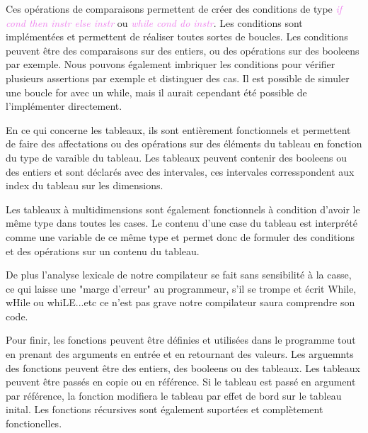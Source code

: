 \documentclass[a4paper]{article}
\let\oldtextit\textit
\renewcommand{\textit}[1]{\textcolor{violet}{\oldtextit{#1}}}
\begin{document}
Ces opérations de comparaisons permettent de créer des conditions de type \textit{if cond then instr else instr } ou \textit{while cond do instr}. Les conditions sont implémentées et permettent de réaliser toutes sortes de boucles. Les conditions peuvent être des comparaisons sur des entiers, ou des opérations sur des booleens par exemple.
Nous pouvons également imbriquer les conditions pour vérifier plusieurs assertions par exemple et distinguer des cas.
Il est possible de simuler une boucle for avec un while, mais il aurait cependant été possible de l'implémenter directement.

En ce qui concerne les tableaux, ils sont entièrement fonctionnels et permettent de faire des affectations ou des opérations sur des éléments du tableau en fonction du type de varaible du tableau. Les tableaux peuvent contenir des booleens ou des entiers et sont déclarés avec des intervales, ces intervales corresspondent aux index du tableau sur les dimensions.

Les tableaux à multidimensions sont également fonctionnels à condition d'avoir le même type dans toutes les cases. Le contenu d'une case du tableau est interprété comme une variable de ce même type et permet donc de formuler des conditions et des opérations sur un contenu du tableau.

De plus l'analyse lexicale de notre compilateur se fait sans sensibilité à la casse, ce qui laisse une "marge d'erreur" au programmeur, s'il se trompe et écrit While, wHile ou whiLE...etc ce n'est pas grave notre compilateur saura comprendre son code.

Pour finir, les fonctions peuvent être définies et utilisées dans le programme tout en prenant des arguments en entrée et en retournant des valeurs.
Les arguemnts des fonctions peuvent être des entiers, des booleens ou des tableaux. Les tableaux peuvent être passés en copie ou en référence. Si le tableau est passé en argument par référence, la fonction modifiera le tableau par effet de bord sur le tableau inital. Les fonctions récursives sont également suportées et complètement fonctionelles.
\end{document}

